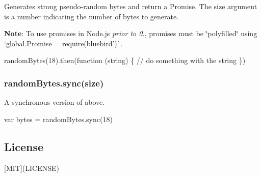 Generates strong pseudo-\/random bytes and return a {\ttfamily Promise}. The {\ttfamily size} argument is a number indicating the number of bytes to generate.

{\bfseries Note}\+: To use promises in Node.\+js {\itshape prior to 0.}, promises must be \char`\"{}polyfilled\char`\"{} using `global.\+Promise = require(\textquotesingle{}bluebird')\`{}.


\begin{DoxyCode}
randomBytes(18).then(function (string) \{
  // do something with the string
\})
\end{DoxyCode}


\subsubsection*{random\+Bytes.\+sync(size)}

A synchronous version of above.


\begin{DoxyCode}
var bytes = randomBytes.sync(18)
\end{DoxyCode}


\subsection*{License}

\mbox{[}M\+IT\mbox{]}(L\+I\+C\+E\+N\+SE) 